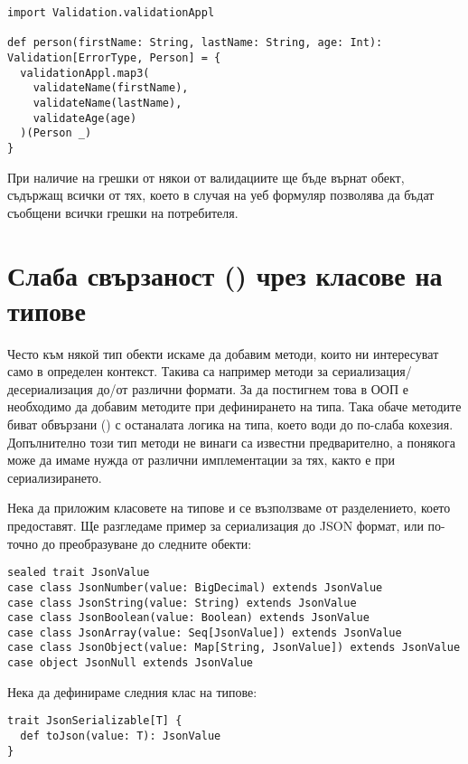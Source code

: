 \begin{lstlisting}
import Validation.validationAppl

def person(firstName: String, lastName: String, age: Int): Validation[ErrorType, Person] = {
  validationAppl.map3(
    validateName(firstName),
    validateName(lastName),
    validateAge(age)
  )(Person _)
}
\end{lstlisting}

При наличие на грешки от някои от валидациите ще бъде върнат  обект, съдържащ всички от тях, което в случая на уеб формуляр позволява да бъдат съобщени всички грешки на потребителя.

\section{Слаба свързаност () чрез класове на типове}

Често към някой тип обекти искаме да добавим методи, които ни интересуват само в определен контекст. Такива са например методи за сериализация/десериализация до/от различни формати. За да постигнем това в ООП е необходимо да добавим методите при дефинирането на типа. Така обаче методите биват обвързани () с останалата логика на типа, което води до по-слаба кохезия. Допълнително този тип методи не винаги са известни предварително, а понякога може да имаме нужда от различни имплементации за тях, както е при сериализирането.

Нека да приложим класовете на типове и се възползваме от разделението, което предоставят. Ще разгледаме пример за сериализация до JSON формат, или по-точно до преобразуване до следните обекти:

\begin{lstlisting}
sealed trait JsonValue
case class JsonNumber(value: BigDecimal) extends JsonValue
case class JsonString(value: String) extends JsonValue
case class JsonBoolean(value: Boolean) extends JsonValue
case class JsonArray(value: Seq[JsonValue]) extends JsonValue
case class JsonObject(value: Map[String, JsonValue]) extends JsonValue
case object JsonNull extends JsonValue
\end{lstlisting}

Нека да дефинираме следния клас на типове:

\begin{lstlisting}
trait JsonSerializable[T] {
  def toJson(value: T): JsonValue
}
\end{lstlisting}

